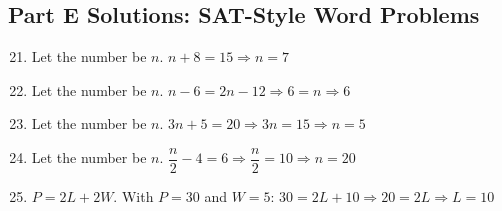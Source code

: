 \documentclass[14pt]{extarticle}
\begin{document}
\subsection*{Part E Solutions: SAT-Style Word Problems}
\begin{enumerate}
    \setcounter{enumi}{20}
    \item Let the number be \(n\). \(n + 8 = 15 \Rightarrow n = \boxed{7}\)
    \item Let the number be \(n\). \(n - 6 = 2n - 12 \Rightarrow 6 = n \Rightarrow \boxed{6}\)
    \item Let the number be \(n\). \(3n + 5 = 20 \Rightarrow 3n = 15 \Rightarrow n = \boxed{5}\)
    \item Let the number be \(n\). \(\dfrac{n}{2} - 4 = 6 \Rightarrow \dfrac{n}{2} = 10 \Rightarrow n = \boxed{20}\)
    \item \(P = 2L + 2W\). With \(P = 30\) and \(W = 5\): \(30 = 2L + 10 \Rightarrow 20 = 2L \Rightarrow L = \boxed{10}\)
\end{enumerate}
\end{document}
